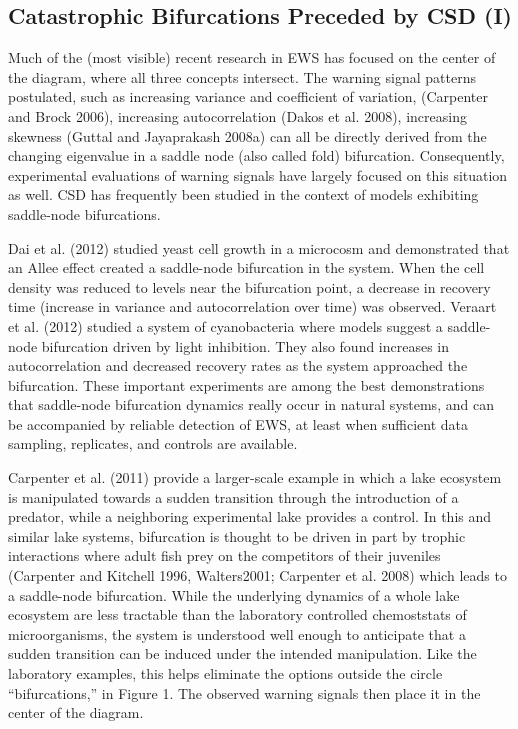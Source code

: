 \documentclass{article}
\begin{document}
\subsection{Catastrophic Bifurcations Preceded by CSD (I)}

Much of the (most visible) recent research in EWS has focused on the
center of the diagram, where all three concepts intersect. The warning
signal patterns postulated, such as increasing variance and coefficient
of variation, (Carpenter and Brock 2006), increasing autocorrelation
(Dakos et al. 2008), increasing skewness (Guttal and Jayaprakash 2008a)
can all be directly derived from the changing eigenvalue in a saddle
node (also called fold) bifurcation. Consequently, experimental
evaluations of warning signals have largely focused on this situation as
well. CSD has frequently been studied in the context of models
exhibiting saddle-node bifurcations.

Dai et al. (2012) studied yeast cell growth in a microcosm and
demonstrated that an Allee effect created a saddle-node bifurcation in
the system. When the cell density was reduced to levels near the
bifurcation point, a decrease in recovery time (increase in variance and
autocorrelation over time) was observed. Veraart et al. (2012) studied a
system of cyanobacteria where models suggest a saddle-node bifurcation
driven by light inhibition. They also found increases in autocorrelation
and decreased recovery rates as the system approached the bifurcation.
These important experiments are among the best demonstrations that
saddle-node bifurcation dynamics really occur in natural systems, and
can be accompanied by reliable detection of EWS, at least when
sufficient data sampling, replicates, and controls are available.

Carpenter et al. (2011) provide a larger-scale example in which a lake
ecosystem is manipulated towards a sudden transition through the
introduction of a predator, while a neighboring experimental lake
provides a control. In this and similar lake systems, bifurcation is
thought to be driven in part by trophic interactions where adult fish
prey on the competitors of their juveniles (Carpenter and Kitchell 1996,
Walters2001; Carpenter et al. 2008) which leads to a saddle-node
bifurcation. While the underlying dynamics of a whole lake ecosystem are
less tractable than the laboratory controlled chemoststats of
microorganisms, the system is understood well enough to anticipate that
a sudden transition can be induced under the intended manipulation. Like
the laboratory examples, this helps eliminate the options outside the
circle ``bifurcations,'' in Figure 1. The observed warning signals then
place it in the center of the diagram.
\end{document}
